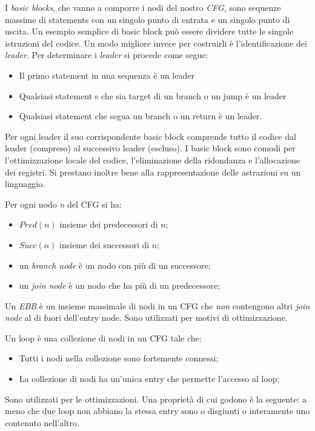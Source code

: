 \documentclass[a4paper, 10pt]{book}
\newenvironment{definition}[1][Definizione]{\begin{trivlist}
\item[\hskip \labelsep {\bfseries #1}]}{\end{trivlist}}
\begin{document}
\begin{definition}[Basic block]
    I \emph{basic blocks}, che vanno a comporre i nodi del nostro \emph{CFG}, sono sequenze massime di 
    statements con un singolo punto di entrata e un singolo punto di uscita. Un esempio semplice di basic 
    block può essere dividere tutte le singole istruzioni del codice. Un modo migliore invece per costruirli è
    l'identificazione dei \emph{leader}. Per determinare i \emph{leader}  si procede come segue:
    \begin{itemize}
        \item Il primo statement in una sequenza è un leader
        \item Qualsiasi statement s che sia target di un branch o un jump è un leader
        \item Qualsiasi statement che segua un branch o un return è un leader.
    \end{itemize}
    Per ogni leader il suo corrispondente basic block comprende tutto il codice dal leader (compreso) al 
    successivo leader (escluso).
    I basic block sono comodi per l'ottimizzazione locale del codice, l'eliminazione della ridondanza e 
    l'allocazione dei registri. Si prestano inoltre bene alla rappresentazione delle astrazioni su un
    linguaggio.
\end{definition}

Per ogni nodo \emph{n} del CFG si ha:
\begin{itemize}
    \item $Pred(n)$ insieme dei predecessori di $n$;
    \item $Succ(n)$ insieme dei successori di $n$;
    \item un \emph{branch node} è un nodo con più di un successore;
    \item un \emph{join node} è un nodo che ha più di un predecessore;
\end{itemize}

\begin{definition}[Extended Basic Block (EBB)]
    Un \emph{EBB} è un insieme massimale di nodi in un CFG che \emph{non} contengono altri \emph{join node} al
    di fuori dell'entry node. Sono utilizzati per motivi di ottimizzazione.
\end{definition}

\begin{definition}[Natural Loop]
    Un loop è una collezione di nodi in un CFG tale che:
    \begin{itemize}
        \item Tutti i nodi nella collezione sono fortemente connessi;
        \item La collezione di nodi ha un'unica entry che permette l'accesso al loop;
    \end{itemize}
    Sono utilizzati per le ottimizzazioni. Una proprietà di cui godono è la seguente: a meno che due loop non
    abbiano la stessa entry sono o disgiunti o interamente uno contenuto nell'altro.
\end{definition}
\end{document}

